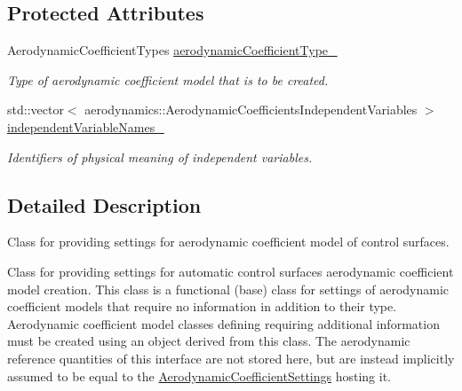 \subsection*{Protected Attributes}
\begin{DoxyCompactItemize}
\item 
Aerodynamic\+Coefficient\+Types \hyperlink{classtudat_1_1simulation__setup_1_1ControlSurfaceIncrementAerodynamicCoefficientSettings_ad5d0fc09b99daeb12b2fd469caea0fa8}{aerodynamic\+Coefficient\+Type\+\_\+}\hypertarget{classtudat_1_1simulation__setup_1_1ControlSurfaceIncrementAerodynamicCoefficientSettings_ad5d0fc09b99daeb12b2fd469caea0fa8}{}\label{classtudat_1_1simulation__setup_1_1ControlSurfaceIncrementAerodynamicCoefficientSettings_ad5d0fc09b99daeb12b2fd469caea0fa8}

\begin{DoxyCompactList}\small\item\em Type of aerodynamic coefficient model that is to be created. \end{DoxyCompactList}\item 
std\+::vector$<$ aerodynamics\+::\+Aerodynamic\+Coefficients\+Independent\+Variables $>$ \hyperlink{classtudat_1_1simulation__setup_1_1ControlSurfaceIncrementAerodynamicCoefficientSettings_a1045014102e0796a6864d8c624be813b}{independent\+Variable\+Names\+\_\+}\hypertarget{classtudat_1_1simulation__setup_1_1ControlSurfaceIncrementAerodynamicCoefficientSettings_a1045014102e0796a6864d8c624be813b}{}\label{classtudat_1_1simulation__setup_1_1ControlSurfaceIncrementAerodynamicCoefficientSettings_a1045014102e0796a6864d8c624be813b}

\begin{DoxyCompactList}\small\item\em Identifiers of physical meaning of independent variables. \end{DoxyCompactList}\end{DoxyCompactItemize}


\subsection{Detailed Description}
Class for providing settings for aerodynamic coefficient model of control surfaces. 

Class for providing settings for automatic control surfaces aerodynamic coefficient model creation. This class is a functional (base) class for settings of aerodynamic coefficient models that require no information in addition to their type. Aerodynamic coefficient model classes defining requiring additional information must be created using an object derived from this class. The aerodynamic reference quantities of this interface are not stored here, but are instead implicitly assumed to be equal to the \hyperlink{classtudat_1_1simulation__setup_1_1AerodynamicCoefficientSettings}{Aerodynamic\+Coefficient\+Settings} hosting it. 

